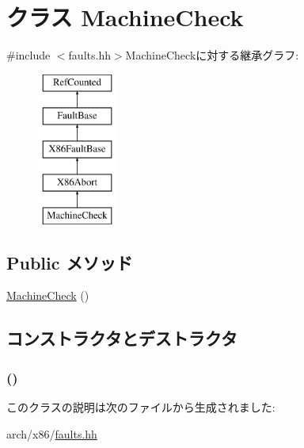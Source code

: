 \hypertarget{classX86ISA_1_1MachineCheck}{
\section{クラス MachineCheck}
\label{classX86ISA_1_1MachineCheck}
}


{\ttfamily \#include $<$faults.hh$>$}MachineCheckに対する継承グラフ:\begin{figure}[H]
\begin{center}
\leavevmode
\includegraphics[height=5cm]{classX86ISA_1_1MachineCheck}
\end{center}
\end{figure}
\subsection*{Public メソッド}
\begin{DoxyCompactItemize}
\item 
\hyperlink{classX86ISA_1_1MachineCheck_aaee62569ed09311e48c988bcd2284bb7}{MachineCheck} ()
\end{DoxyCompactItemize}


\subsection{コンストラクタとデストラクタ}
\hypertarget{classX86ISA_1_1MachineCheck_aaee62569ed09311e48c988bcd2284bb7}{
\subsubsection[{MachineCheck}]{ ()}}
\label{classX86ISA_1_1MachineCheck_aaee62569ed09311e48c988bcd2284bb7}



\begin{DoxyCode}
359                        :
360             X86Abort("Machine-Check", "#MC", 18)
361         {}
    };
\end{DoxyCode}


このクラスの説明は次のファイルから生成されました:\begin{DoxyCompactItemize}
\item 
arch/x86/\hyperlink{arch_2x86_2faults_8hh}{faults.hh}\end{DoxyCompactItemize}
